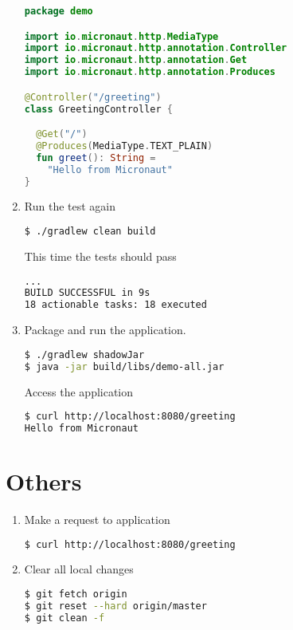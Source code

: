 \documentclass[12pt, letterpaper]{article}
\begin{document}
\begin{enumerate}
	      \begin{lstlisting}[language=Kotlin]
package demo

import io.micronaut.http.MediaType
import io.micronaut.http.annotation.Controller
import io.micronaut.http.annotation.Get
import io.micronaut.http.annotation.Produces

@Controller("/greeting")
class GreetingController {

  @Get("/")
  @Produces(MediaType.TEXT_PLAIN)
  fun greet(): String =
    "Hello from Micronaut"
}
	      \end{lstlisting}

	\item Run the test again

	      \begin{lstlisting}[language=bash]
$ ./gradlew clean build
	      \end{lstlisting}

	      This time the tests should pass

	      \begin{lstlisting}[language=bash]
...
BUILD SUCCESSFUL in 9s
18 actionable tasks: 18 executed
	      \end{lstlisting}

	\item Package and run the application.

	      \begin{lstlisting}[language=bash]
$ ./gradlew shadowJar
$ java -jar build/libs/demo-all.jar
	      \end{lstlisting}

	      Access the application

	      \begin{lstlisting}[language=bash]
$ curl http://localhost:8080/greeting
Hello from Micronaut
	      \end{lstlisting}

\end{enumerate}

\section{Others}

\begin{enumerate}

	\item Make a request to application
	      \begin{lstlisting}[language=bash]
$ curl http://localhost:8080/greeting
	      \end{lstlisting}

	\item Clear all local changes
	      \begin{lstlisting}[language=bash]
$ git fetch origin
$ git reset --hard origin/master
$ git clean -f
	      \end{lstlisting}

\end{enumerate}
\end{document}
